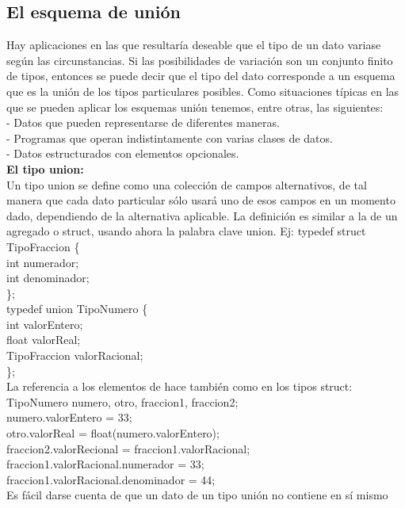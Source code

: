 \documentclass[11pt,a4paper]{article}
\begin{document}
   \subsection{El esquema de unión}
   Hay aplicaciones en las que resultaría deseable que el tipo de un dato variase según las circunstancias. Si las posibilidades de variación son un conjunto finito de tipos, entonces se puede decir que el tipo del dato corresponde a un esquema que es la unión de los tipos particulares posibles. Como situaciones típicas en las que se pueden aplicar los esquemas unión tenemos, entre otras, las siguientes:\\
   - Datos que pueden representarse de diferentes maneras.\\
   - Programas que operan indistintamente con varias clases de datos.\\
   - Datos estructurados con elementos opcionales.\\
   \textbf{El tipo union:}\\
   Un tipo union se define como una colección de campos alternativos,
   de tal manera que cada dato particular sólo usará uno de esos campos en un momento dado, dependiendo de la alternativa aplicable. La definición
   es similar a la de un agregado o struct, usando ahora la palabra clave union. Ej:
   typedef struct TipoFraccion \{ \\
   int numerador;\\
   int denominador;\\
    \};\\
    typedef union TipoNumero \{ \\
    int valorEntero;\\
    float valorReal;\\
    TipoFraccion valorRacional;\\
    \};\\
    La referencia a los elementos de hace también como en los tipos struct:\\
    TipoNumero numero, otro, fraccion1, fraccion2;\\
    numero.valorEntero = 33;\\
    otro.valorReal = float(numero.valorEntero);\\
    fraccion2.valorRecional = fraccion1.valorRacional;\\
    fraccion1.valorRacional.numerador = 33;\\
    fraccion1.valorRacional.denominador = 44;\\
    Es fácil darse cuenta de que un dato de un tipo unión no contiene en sí mismo
\end{document}
